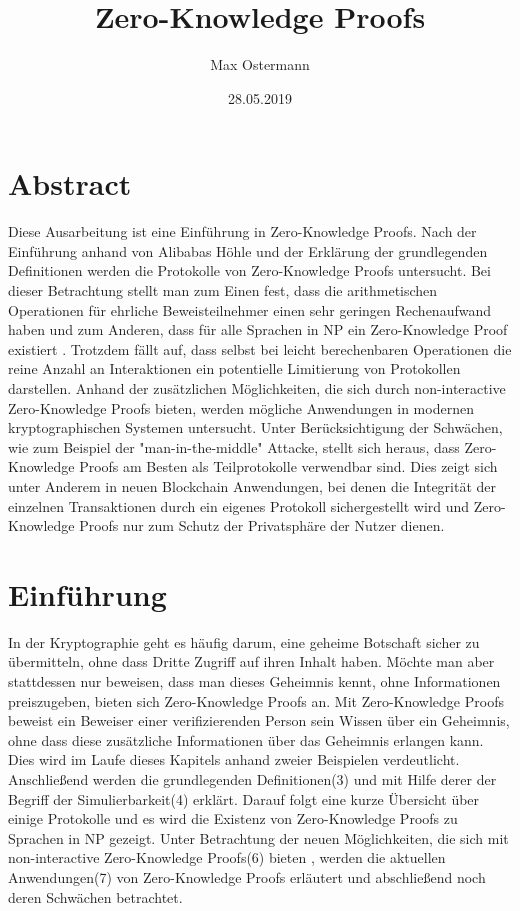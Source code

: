 \documentclass {article}
\title{Zero-Knowledge Proofs}
\author{Max Ostermann}
\date{28.05.2019}
\begin{document}
\maketitle
{}
\newpage
{}

\section{Abstract}


Diese Ausarbeitung ist eine Einf\"uhrung in Zero-Knowledge Proofs.
Nach der Einf\"uhrung anhand von Alibabas H\"ohle und der Erkl\"arung der grundlegenden Definitionen werden die Protokolle von Zero-Knowledge Proofs untersucht.
Bei dieser Betrachtung stellt man zum Einen fest, dass die arithmetischen Operationen für ehrliche Beweisteilnehmer einen sehr geringen Rechenaufwand haben und zum Anderen, dass f\"ur alle Sprachen in NP ein Zero-Knowledge Proof existiert \cite{GO94}. Trotzdem f\"allt auf, dass selbst bei leicht berechenbaren Operationen die reine Anzahl an Interaktionen ein potentielle Limitierung von Protokollen darstellen.
Anhand der zus\"atzlichen M\"oglichkeiten, die sich durch non-interactive Zero-Knowledge Proofs bieten, werden m\"ogliche Anwendungen in modernen kryptographischen Systemen untersucht. Unter Ber\"ucksichtigung der Schw\"achen, wie zum Beispiel der "man-in-the-middle" Attacke, stellt sich heraus, dass Zero-Knowledge Proofs am Besten als Teilprotokolle verwendbar sind. Dies zeigt sich unter Anderem in neuen Blockchain Anwendungen, bei denen die Integrität der einzelnen Transaktionen durch ein eigenes Protokoll sichergestellt wird und Zero-Knowledge Proofs nur zum Schutz der Privatsph\"are der Nutzer dienen.
\\


\newpage

\tableofcontents

\newpage 

\section{Einf\"uhrung}

In der Kryptographie geht es häufig darum, eine geheime Botschaft sicher zu übermitteln, ohne dass Dritte Zugriff auf ihren Inhalt haben. Möchte man aber stattdessen nur beweisen, dass man dieses Geheimnis kennt, ohne Informationen preiszugeben, bieten sich Zero-Knowledge Proofs an. Mit Zero-Knowledge Proofs beweist ein Beweiser einer verifizierenden Person sein Wissen über ein Geheimnis, ohne dass diese zusätzliche Informationen über das Geheimnis erlangen kann.\\
Dies wird im Laufe dieses Kapitels anhand zweier Beispielen verdeutlicht. Anschließend werden die grundlegenden Definitionen(3) und mit Hilfe derer der Begriff der Simulierbarkeit(4) erklärt. 
Darauf folgt eine kurze \"Ubersicht über einige Protokolle und es wird die Existenz von Zero-Knowledge Proofs zu Sprachen in NP gezeigt. Unter Betrachtung der neuen M\"oglichkeiten, die sich mit non-interactive Zero-Knowledge Proofs(6) bieten , werden die aktuellen Anwendungen(7) von Zero-Knowledge Proofs erl\"autert und abschließend noch deren Schw\"achen betrachtet.
\\
\end{document}
